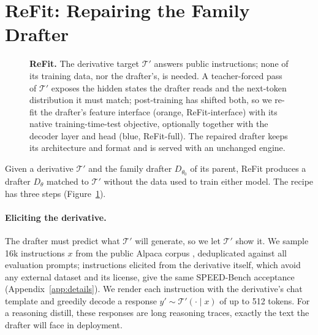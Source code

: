 \documentclass[11pt]{article}
\DeclareRobustCommand*\circled[1]{\tikz[baseline=(char.base)]{\node[shape=circle,draw,inner sep=0.8pt,font=\scriptsize\bfseries] (char) {#1};}}
\newcommand{\Tp}{\mathcal{T}'}
\newcommand{\refit}{ReFit}
\newcommand{\refitI}{ReFit-interface}
\newcommand{\refitF}{ReFit-full}
\begin{document}
\section{ReFit: Repairing the Family Drafter}
\label{sec:method}

\begin{figure}[t]
  \centering
  \resizebox{\textwidth}{!}{}
  \caption{\textbf{\refit{}.} \circled{1} The derivative target $\Tp$ answers public instructions; none of its training data, nor the drafter's, is needed. \circled{2} A teacher-forced pass of $\Tp$ exposes the hidden states the drafter reads and the next-token distribution it must match; post-training has shifted both, so we re-fit the drafter's feature interface (orange, \refitI{}) with its native training-time-test objective, optionally together with the decoder layer and head (blue, \refitF{}). \circled{3} The repaired drafter keeps its architecture and format and is served with an unchanged engine.}
  \label{fig:method}
\end{figure}

Given a derivative $\Tp$ and the family drafter $D_{\theta_0}$ of its parent, \refit{} produces a drafter $D_{\theta}$ matched to $\Tp$ without the data used to train either model.
The recipe has three steps (Figure~\ref{fig:method}).

\paragraph{Eliciting the derivative.}
The drafter must predict what $\Tp$ will generate, so we let $\Tp$ show it.
We sample 16k instructions $x$ from the public Alpaca corpus \citep{taori2023alpaca}, deduplicated against all evaluation prompts; instructions elicited from the derivative itself, which avoid any external dataset and its license, give the same SPEED-Bench acceptance (Appendix~\ref{app:details}).
We render each instruction with the derivative's chat template and greedily decode a response $y' \sim \Tp(\cdot \mid x)$ of up to 512 tokens.
For a reasoning distill, these responses are long reasoning traces, exactly the text the drafter will face in deployment.
\end{document}
